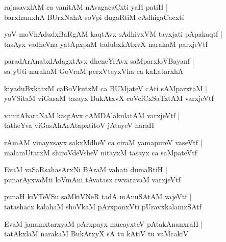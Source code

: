 \documentclass[twoside,12pt,openright]{book}
\newcounter{shloka}[chapter]
\begin{document}
\begin{shloka}%
rajasavxlAM ca vanitAM nAvagacaCxti yaH patiH |\\
barxhamxhA BUrxNahA soVpi dugaRtiM cAdhigaCacxti 
\end{shloka}

\begin{shloka}%
yoV moVhAdudxBaRgAM kaqtAvx sAdhivxVM tayxjati pApakaqtf |\\
tasAyx vadheVna yatApxpaM tadubxkAtxvX narakaM parxjeVtf
\end{shloka}

\begin{shloka}%
paradArAnabxlAdagxtAvx dheneYrAvx saMparxloVBayanf |\\
sa yUti narakaM GoVraM perxVteyxVha ca kaLatarxhA
\end{shloka}

\begin{shloka}%
kiyaduBxkatxM caBoVkutxM ca BUMjateV cAti sAMparxtaM |\\
yoVSitaM viGasaM tasayx BukAtxvX coVciCxSaTxtAM varxjeVtf
\end{shloka}

\begin{shloka}%
vanitAharaNaM kaqtAvx cAMDAlakulatAM varxjeVtf |\\
tatheYva viGasAhArAtapxtitoV jAtayeV naraH 
\end{shloka}

\begin{shloka}%
rAmAM vinayxsayx sakxMdheV ca ciraM yamapureV vaseVtf |\\
malamUtarxM shiroVdeVsheV nitayxM tasayx ca saMpateVtf
\end{shloka}

\begin{shloka}%
EvaM vaSaRsahasArxNi BAraM vahati dumaRtiH |\\
punarAyxvaMti loVmAni tAvatasx rwvaravaM varxjeVtf
\end{shloka}

\begin{shloka}%
punaH kiVTeVSu saMkiVNeR tadA mAnuSAtAM vajeVtf |\\
tatashacx kalahaM shoVkaM pArxponxVti pUravxkalamxSAtf 
\end{shloka}

\begin{shloka}%
EvaM janamxtarxyaM pArxpayx mucayxteV pAtakAnanxraH |\\
tatAkxlaM narakaM BukAtxyX sA tu kAtiV tu vaMcakiV 
\end{shloka}
\end{document}
